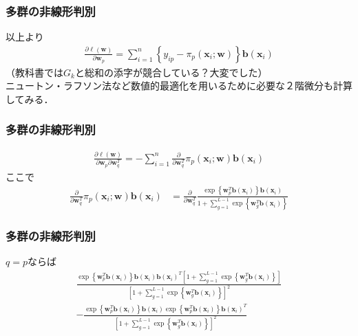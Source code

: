 \documentclass[dvipdfmx,cjk]{beamer}
\theoremstyle{example}
\begin{document}
\begin{frame}
    \frametitle{多群の非線形判別}
    以上より
    \begin{align*}
        \frac{\partial \ell(\boldsymbol{w})}{\partial \boldsymbol{w}_p}=\sum_{i=1}^{n}\left\{y_{ip}-\pi_p(\boldsymbol{x}_i;\boldsymbol{w})\right\}\boldsymbol{b}(\boldsymbol{x}_i)
    \end{align*}
    （教科書では$G_k$と総和の添字が競合している？大変でした）\\
    ニュートン・ラフソン法など数値的最適化を用いるために必要な２階微分も計算してみる．
\end{frame}

\begin{frame}
    \frametitle{多群の非線形判別}
    \begin{align*}
        \frac{\partial \ell(\boldsymbol{w})}{\partial \boldsymbol{w}_p \partial \boldsymbol{w}_q^T}=-\sum_{i=1}^{n}\frac{\partial}{\partial \boldsymbol{w}_q^T}\pi_p(\boldsymbol{x}_i;\boldsymbol{w})\boldsymbol{b}(\boldsymbol{x}_i)
    \end{align*}
    ここで
    \begin{align*}
        \frac{\partial}{\partial \boldsymbol{w}_q^T}\pi_p(\boldsymbol{x}_i;\boldsymbol{w})\boldsymbol{b}(\boldsymbol{x}_i) & =\frac{\partial}{\partial \boldsymbol{w}_q^T}\frac{\exp\left\{\boldsymbol{w}_p^T\boldsymbol{b}(\boldsymbol{x}_i)\right\}\boldsymbol{b}(\boldsymbol{x}_i)}{1+\sum\limits_{g=1}^{L-1}\exp\left\{\boldsymbol{w}_g^T\boldsymbol{b}(\boldsymbol{x}_i)\right\}}
    \end{align*}
\end{frame}

\begin{frame}
    \frametitle{多群の非線形判別}
    $q=p$ならば
    \begin{align*}
        \frac{\exp\left\{\boldsymbol{w}_p^T\boldsymbol{b}(\boldsymbol{x}_i)\right\}\boldsymbol{b}(\boldsymbol{x}_i)\boldsymbol{b}(\boldsymbol{x}_i)^T\left[1+\sum\limits_{g=1}^{L-1}\exp\left\{\boldsymbol{w}_g^T\boldsymbol{b}(\boldsymbol{x}_i)\right\}\right]}{\left[1+\sum\limits_{g=1}^{L-1}\exp\left\{\boldsymbol{w}_g^T\boldsymbol{b}(\boldsymbol{x}_i)\right\}\right]^2} \\
        -\frac{\exp\left\{\boldsymbol{w}_p^T\boldsymbol{b}(\boldsymbol{x}_i)\right\}\boldsymbol{b}(\boldsymbol{x}_i)\exp\left\{\boldsymbol{w}_p^T\boldsymbol{b}(\boldsymbol{x}_i)\right\}\boldsymbol{b}(\boldsymbol{x}_i)^T}{\left[1+\sum\limits_{g=1}^{L-1}\exp\left\{\boldsymbol{w}_g^T\boldsymbol{b}(\boldsymbol{x}_i)\right\}\right]^2}
    \end{align*}
\end{frame}
\end{document}
